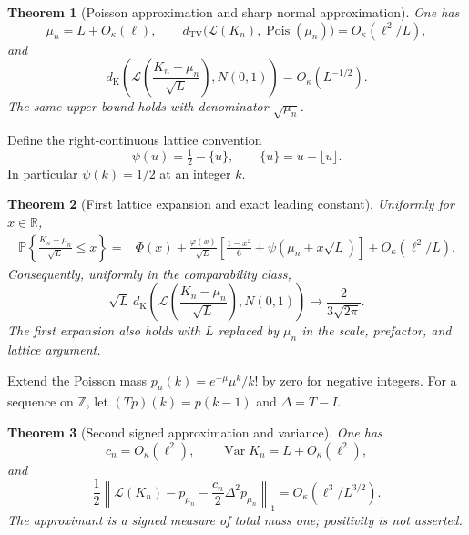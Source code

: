 \documentclass[11pt]{article}
\newcommand{\Pp}{\mathbb P}
\newcommand{\Var}{\operatorname{Var}}
\newcommand{\Pois}{\operatorname{Pois}}
\newcommand{\TV}{d_{\mathrm{TV}}}
\newcommand{\Kol}{d_{\mathrm K}}
\newcommand{\Law}{\mathcal L}
\newtheorem{theorem}{Theorem}[section]
\theoremstyle{remark}
\begin{document}
\begin{theorem}[Poisson approximation and sharp normal approximation]\label{thm:poisson-be}
One has
\begin{equation}\label{eq:main-poisson}
 \mu_n=L+O_\kappa(\ell),\qquad
 \TV\bigl(\Law(K_n),\Pois(\mu_n)\bigr)=O_\kappa(\ell^2/L),
\end{equation}
and
\begin{equation}\label{eq:main-be}
 \Kol\left(\Law\left(\frac{K_n-\mu_n}{\sqrt L}\right),N(0,1)\right)
 =O_\kappa(L^{-1/2}).
\end{equation}
The same upper bound holds with denominator $\sqrt{\mu_n}$.
\end{theorem}

Define the right-continuous lattice convention
\[
 \psi(u)=\tfrac12-\{u\},\qquad \{u\}=u-\lfloor u\rfloor.
\]
In particular $\psi(k)=1/2$ at an integer $k$.
\begin{theorem}[First lattice expansion and exact leading constant]\label{thm:first}
Uniformly for $x\in\mathbb R$,
\begin{equation}\label{eq:first}
\begin{split}
 \Pp\left\{\frac{K_n-\mu_n}{\sqrt L}\le x\right\}
 ={}&\Phi(x)+\frac{\varphi(x)}{\sqrt L}
 \left[\frac{1-x^2}{6}+\psi(\mu_n+x\sqrt L)\right]
 +O_\kappa(\ell^2/L).
\end{split}
\end{equation}
Consequently, uniformly in the comparability class,
\begin{equation}\label{eq:constant}
 \sqrt L\,\Kol\left(\Law\left(\frac{K_n-\mu_n}{\sqrt L}\right),N(0,1)\right)
 \longrightarrow\frac{2}{3\sqrt{2\pi}}.
\end{equation}
The first expansion also holds with $L$ replaced by $\mu_n$ in the scale, prefactor, and lattice argument.
\end{theorem}

Extend the Poisson mass $p_\mu(k)=e^{-\mu}\mu^k/k!$ by zero for negative integers. For a sequence on $\mathbb Z$, let $(Tp)(k)=p(k-1)$ and $\Delta=T-I$.
\begin{theorem}[Second signed approximation and variance]\label{thm:signed}
One has
\begin{equation}\label{eq:variance}
 c_n=O_\kappa(\ell^2),\qquad \Var K_n=L+O_\kappa(\ell^2),
\end{equation}
and
\begin{equation}\label{eq:signed}
 \frac12\left\|\Law(K_n)-p_{\mu_n}-\frac{c_n}{2}\Delta^2p_{\mu_n}\right\|_1
 =O_\kappa(\ell^3/L^{3/2}).
\end{equation}
The approximant is a signed measure of total mass one; positivity is not asserted.
\end{theorem}
\end{document}
